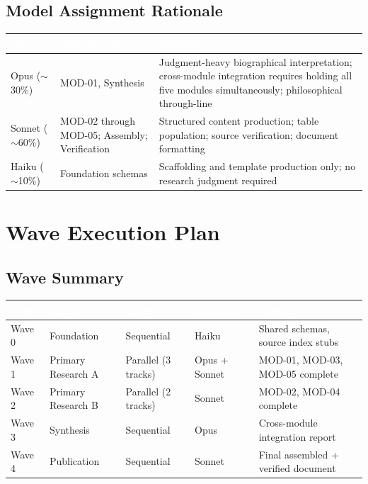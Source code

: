 \documentclass[11pt,letterpaper]{article}
\newcommand{\tableheader}[1]{\textbf{\sffamily\textcolor{white}{#1}}}
\begin{document}
\subsection{Model Assignment Rationale}

\begin{center}
\begin{tabularx}{\textwidth}{L{2cm}L{3cm}X}
\toprule
{}
\tableheader{Model} & \tableheader{Assigned To} & \tableheader{Rationale} \\
\midrule
Opus ($\sim$30\%) & MOD-01, Synthesis & Judgment-heavy biographical interpretation; cross-module integration requires holding all five modules simultaneously; philosophical through-line \\
Sonnet ($\sim$60\%) & MOD-02 through MOD-05; Assembly; Verification & Structured content production; table population; source verification; document formatting \\
Haiku ($\sim$10\%) & Foundation schemas & Scaffolding and template production only; no research judgment required \\
\bottomrule
\end{tabularx}
\end{center}

\section{Wave Execution Plan}

\subsection{Wave Summary}

\begin{center}
\begin{tabularx}{\textwidth}{C{1.2cm}L{3cm}L{2cm}L{2.5cm}X}
\toprule
{}
\tableheader{Wave} & \tableheader{Name} & \tableheader{Mode} & \tableheader{Model(s)} & \tableheader{Output} \\
\midrule
Wave 0 & Foundation & Sequential & Haiku & Shared schemas, source index stubs \\
Wave 1 & Primary Research A & Parallel (3 tracks) & Opus + Sonnet & MOD-01, MOD-03, MOD-05 complete \\
Wave 2 & Primary Research B & Parallel (2 tracks) & Sonnet & MOD-02, MOD-04 complete \\
Wave 3 & Synthesis & Sequential & Opus & Cross-module integration report \\
Wave 4 & Publication & Sequential & Sonnet & Final assembled + verified document \\
\bottomrule
\end{tabularx}
\end{center}
\end{document}
